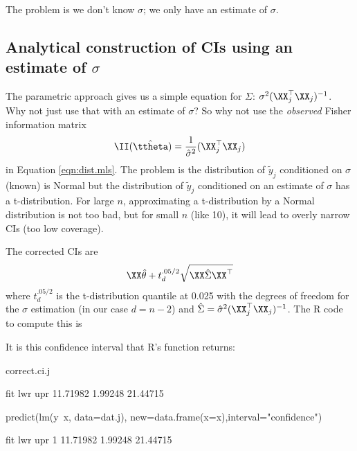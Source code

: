 The problem is we don't know $\sigma$; we only have an estimate of $\sigma$. 

\subsection{Analytical construction of CIs using an estimate of $\sigma$}

The parametric approach gives us a simple equation for $\Sigma$: $\sigma^2( \XX_j^\top\XX_j)^{-1}$.  Why not just use that with an estimate of $\sigma$? So why not use the \emph{observed} Fisher information matrix
$$ \II(\hat{\ttheta})=\frac{1}{\hat{\sigma}^2}(\XX_j^\top\XX_j)$$
in Equation \ref{eqn:dist.mls}.  The problem is the distribution of $\tilde{y}_j$ conditioned on $\sigma$ (known) is Normal but the distribution of $\tilde{y}_j$ conditioned on an estimate of $\sigma$ has a t-distribution. For large $n$, approximating a t-distribution by a Normal distribution is not too bad, but for small $n$ (like 10), it will lead to overly narrow CIs (too low coverage).

The corrected CIs are
\begin{equation}
\XX \hat{\theta}  + t^{.05/2}_{d} \sqrt{\XX\hat{\Sigma}\XX^\top}
\label{eqn:analytical.CIs}
\end{equation}
where $t^{.05/2}_{d}$ is the t-distribution quantile at 0.025 with the degrees of freedom for the $\sigma$ estimation (in our case $d=n-2$) and $\hat{\Sigma}=\hat{\sigma}^2 (\XX_j^\top\XX_j)^{-1}$. The R code to compute this is
\begin{Schunk}
\end{Schunk}
It is this confidence interval that R's \verb@predict@ function returns:
\begin{Schunk}
\begin{Sinput}
 correct.ci.j
\end{Sinput}
\begin{Soutput}
     fit      lwr      upr 
11.71982  1.99248 21.44715 
\end{Soutput}
\begin{Sinput}
 predict(lm(y~x, data=dat.j), new=data.frame(x=x),interval="confidence")
\end{Sinput}
\begin{Soutput}
       fit     lwr      upr
1 11.71982 1.99248 21.44715
\end{Soutput}
\end{Schunk}

